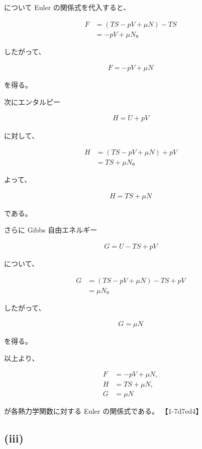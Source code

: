 \documentclass[platex,dvipdfmx,a4paper]{jsarticle}
\begin{document}
について Euler の関係式を代入すると、

\begin{align*}
F
&=
(TS-pV+\mu N)-TS \\
&=
-pV+\mu N。
\end{align*}

したがって、

\begin{align*}
F=-pV+\mu N
\end{align*}

を得る。

次にエンタルピー

\begin{align*}
H=U+pV
\end{align*}

に対して、

\begin{align*}
H
&=
(TS-pV+\mu N)+pV \\
&=
TS+\mu N。
\end{align*}

よって、

\begin{align*}
H=TS+\mu N
\end{align*}

である。

さらに Gibbs 自由エネルギー

\begin{align*}
G
=
U-TS+pV
\end{align*}

について、

\begin{align*}
G
&=
(TS-pV+\mu N)
-TS+pV \\
&=
\mu N。
\end{align*}

したがって、

\begin{align*}
G=\mu N
\end{align*}

を得る。

以上より、

\begin{align*}
F&=-pV+\mu N, \\
H&=TS+\mu N, \\
G&=\mu N
\end{align*}

が各熱力学関数に対する Euler の関係式である。 【1-7d7ed4】

\subsection{(iii)}
\end{document}
